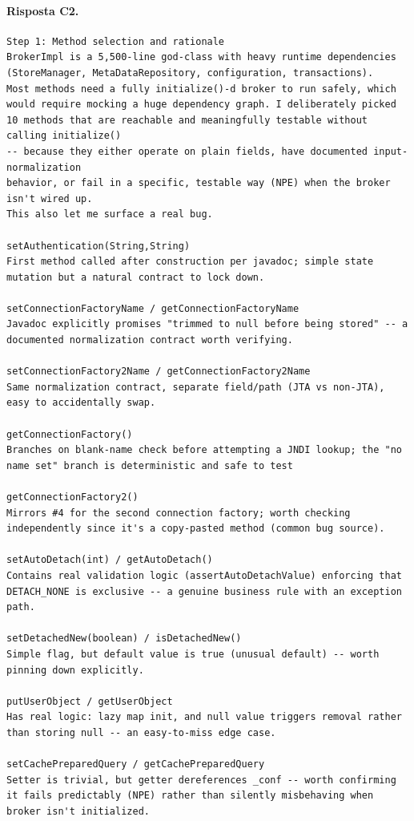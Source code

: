 \paragraph*{Risposta C2.}
\label{risposta:c2}
\begin{lstlisting}
Step 1: Method selection and rationale
BrokerImpl is a 5,500-line god-class with heavy runtime dependencies
(StoreManager, MetaDataRepository, configuration, transactions).
Most methods need a fully initialize()-d broker to run safely, which
would require mocking a huge dependency graph. I deliberately picked
10 methods that are reachable and meaningfully testable without calling initialize()
-- because they either operate on plain fields, have documented input-normalization
behavior, or fail in a specific, testable way (NPE) when the broker isn't wired up.
This also let me surface a real bug.

setAuthentication(String,String)
First method called after construction per javadoc; simple state mutation but a natural contract to lock down.

setConnectionFactoryName / getConnectionFactoryName
Javadoc explicitly promises "trimmed to null before being stored" -- a documented normalization contract worth verifying.

setConnectionFactory2Name / getConnectionFactory2Name
Same normalization contract, separate field/path (JTA vs non-JTA), easy to accidentally swap.

getConnectionFactory()
Branches on blank-name check before attempting a JNDI lookup; the "no name set" branch is deterministic and safe to test

getConnectionFactory2()
Mirrors #4 for the second connection factory; worth checking independently since it's a copy-pasted method (common bug source).

setAutoDetach(int) / getAutoDetach()
Contains real validation logic (assertAutoDetachValue) enforcing that DETACH_NONE is exclusive -- a genuine business rule with an exception path.

setDetachedNew(boolean) / isDetachedNew()
Simple flag, but default value is true (unusual default) -- worth pinning down explicitly.

putUserObject / getUserObject
Has real logic: lazy map init, and null value triggers removal rather than storing null -- an easy-to-miss edge case.

setCachePreparedQuery / getCachePreparedQuery
Setter is trivial, but getter dereferences _conf -- worth confirming it fails predictably (NPE) rather than silently misbehaving when broker isn't initialized.


\end{lstlisting}
